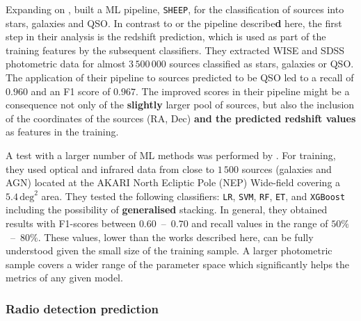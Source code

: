 \documentclass{aa}
\begin{document}
Expanding on \citet{2020A&A...639A..84C}, \citet{2022A&A...666A..87C} built a ML pipeline, \texttt{SHEEP}, for the classification of sources into stars, galaxies and QSO. In contrast to \citet{2020A&A...639A..84C} or the pipeline describe\textbf{d} here, the first step in their analysis is the redshift prediction, which is used as part of the training features by the subsequent classifiers. They extracted WISE and SDSS \citep[DR15;][]{2019ApJS..240...23A} photometric data for almost $3\,500\,000$ sources classified as stars, galaxies or QSO. The application of their pipeline to sources predicted to be QSO led to a recall of $0.960$ and an F1 score of $0.967$. The improved scores in their pipeline might be a consequence not only of the \textbf{slightly} larger pool of sources, but also the inclusion of the coordinates of the sources (RA, Dec) \textbf{and the predicted redshift values} as features in the training. %

A test with a larger number of ML methods was performed by \citet{2021A&A...651A.108P}. For training, they used optical and infrared data from close to $1\,500$ sources (galaxies and AGN) located at the AKARI North Ecliptic Pole (NEP) Wide-field \citep{2009PASJ...61..375L, 2012A&A...548A..29K} covering a $5.4\, \mathrm{deg}^{2}$ area. They tested  the following classifiers: \verb|LR|, \verb|SVM|, \verb|RF|, \verb|ET|, and \verb|XGBoost| including the possibility of \textbf{generalised} stacking. In general, they obtained results with F1-scores between $0.60$~--~$0.70$ and recall values in the range of $50\%$~--~$80\%$. 
These values, lower than the works described here, can be fully understood given the small size of the training sample. A larger photometric sample covers a wider range of the parameter space which significantly helps the metrics of any given model.

\subsubsection{Radio detection prediction}\label{sec:previous_radio_detection}
\end{document}
